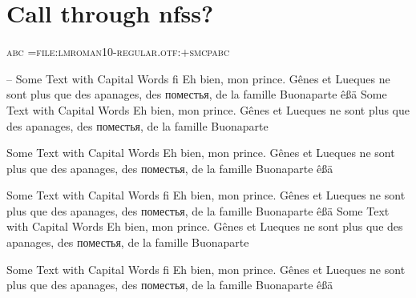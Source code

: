 \documentclass[parskip=half-]{scrartcl}
\begin{document}
\section{Call through nfss?}
\scshape abc
\font\test={file:lmroman10-regular.otf:+smcp}\test abc

\normalsize 
{}\selectfont -- 
Some Text with Capital Words fi
Eh bien, mon prince. Gênes et Lueques ne sont plus que des
apanages, des поместья, de la famille Buonaparte êßä
%
\large
Some Text with Capital Words
Eh bien, mon prince. Gênes et Lueques ne sont plus que des
apanages, des поместья, de la famille Buonaparte

\tiny

Some Text with Capital Words
Eh bien, mon prince. Gênes et Lueques ne sont plus que des
apanages, des поместья, de la famille Buonaparte êßä

\bfseries 
\normalsize

Some Text with Capital Words fi
Eh bien, mon prince. Gênes et Lueques ne sont plus que des
apanages, des поместья, de la famille Buonaparte êßä
%
\large
Some Text with Capital Words
Eh bien, mon prince. Gênes et Lueques ne sont plus que des
apanages, des поместья, de la famille Buonaparte

\tiny 

Some Text with Capital Words fi
Eh bien, mon prince. Gênes et Lueques ne sont plus que des
apanages, des поместья, de la famille Buonaparte êßä
%
\end{document}
